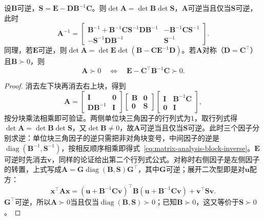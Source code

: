 \begin{theorem}
\label{thm:ls-schur-complement}
设$\bm B$可逆，$\bm S=\bm E-\bm D\bm B^{-1}\bm C$。则$\det\bm A=\det\bm B\det\bm S$，$\bm A$可逆当且仅当$\bm S$可逆，此时
\begin{equation}
 \bm A^{-1}=
 \begin{bmatrix}
  \bm B^{-1}+\bm B^{-1}\bm C\bm S^{-1}\bm D\bm B^{-1}
  &-\bm B^{-1}\bm C\bm S^{-1}\\
  -\bm S^{-1}\bm D\bm B^{-1}&\bm S^{-1}
 \end{bmatrix}.
 \label{eq:matrix-analysis-block-inverse}
\end{equation}
同理，若$\bm E$可逆，则$\det\bm A=\det\bm E\det(\bm B-\bm C\bm E^{-1}\bm D)$。若$\bm A$对称（$\bm D=\bm C^\top$）且$\bm B\succ0$，则
\begin{equation}
 \bm A\succ0\quad\Longleftrightarrow\quad
 \bm E-\bm C^\top\bm B^{-1}\bm C\succ0.
 \label{eq:matrix-analysis-schur-positive-definite}
\end{equation}
\end{theorem}
\begin{proof}
消去左下块再消去右上块，得到
\[
 \bm A=
 \begin{bmatrix}\bm I&\bm0\\\bm D\bm B^{-1}&\bm I\end{bmatrix}
 \begin{bmatrix}\bm B&\bm0\\\bm0&\bm S\end{bmatrix}
 \begin{bmatrix}\bm I&\bm B^{-1}\bm C\\\bm0&\bm I\end{bmatrix},
\]
按分块乘法相乘即可验证。两侧单位块三角因子的行列式为$1$，取行列式得$\det\bm A=\det\bm B\det\bm S$，又$\det\bm B\neq0$，故$\bm A$可逆当且仅当$\bm S$可逆。此时三个因子分别求逆：单位块三角因子的逆只需把非对角块变号，中间因子的逆是$\operatorname{diag}(\bm B^{-1},\bm S^{-1})$，按相反顺序相乘即得式~\eqref{eq:matrix-analysis-block-inverse}。$\bm E$可逆时先消去$\bm v$，同样的论证给出第二个行列式公式。对称时右侧因子是左侧因子的转置，上式写成$\bm A=\bm G\operatorname{diag}(\bm B,\bm S)\bm G^\top$，其中$\bm G$可逆；展开二次型即是对$\bm u$配方：
\[
 \bm x^\top\bm A\bm x
 =(\bm u+\bm B^{-1}\bm C\bm v)^\top\bm B(\bm u+\bm B^{-1}\bm C\bm v)+\bm v^\top\bm S\bm v .
\]
$\bm G^\top$可逆，所以$\bm A\succ0$当且仅当$\operatorname{diag}(\bm B,\bm S)\succ0$；已知$\bm B\succ0$，这又等价于$\bm S\succ0$。
\end{proof}

